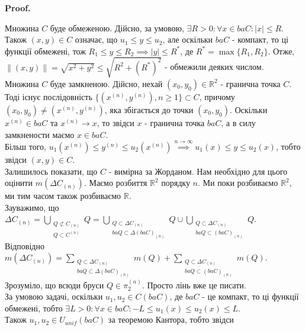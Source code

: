 \documentclass[a4paper, 10pt]{article}
\makeatletter
\def\qed{$\blacksquare$}
\theoremstyle{theoremdd}
\theoremstyle{theoremdd}
\theoremstyle{theoremdd}
\theoremstyle{theoremdd}
\theoremstyle{theoremdd}
\theoremstyle{theoremdd}
\theoremstyle{theoremdd}
\theoremstyle{theoremdd}
\renewenvironment{proof}[1][Proof.\\]{\par
\pushQED{\hfill \qed}%
\normalfont \topsep6\p@\@plus6\p@\relax
\trivlist
\item\relax
{\bfseries
#1\@addpunct{.}}\hspace\labelsep\ignorespaces
}{%
\popQED\endtrivlist\@endpefalse
}
\newcommand\Norm[1]{\left\lVert#1\right\rVert}
\makeatother
\begin{document}
\begin{proof}
Множина $C$ буде обмеженою. Дійсно, за умовою, $\exists R > 0: \forall x \in baC: |x| \leq R$. Також $(x,y) \in C$ означає, що $u_1 \leq y \leq u_2$, але оскільки $baC$ - компакт, то ці функції обмежені, тож $R_1 \leq y \leq R_2 \implies |y| \leq R^*$, де $R^* = \max\{R_1,R_2\}$. Отже,\\
$\Norm{(x,y)} = \sqrt{x^2+y^2} \leq \sqrt{R^2 + (R^*)^2}$ - обмежили деяких числом.
\bigskip \\
Множина $C$ буде замкненою. Дійсно, нехай $(x_0,y_0) \in \mathbb{R}^2$ - гранична точка $C$. Тоді існує послідовність $\{(x^{(n)},y^{(n)}), n \geq 1\} \subset C$, причому $(x_0,y_0) \neq (x^{(n)},y^{(n)})$, яка збігається до точки $(x_0,y_0)$. Оскільки $x^{(n)} \in baC$ та $x^{(n)} \to x$, то звідси $x$ - гранична точка $baC$, а в силу замкнености маємо $x \in baC$.\\
Більш того, $u_1(x^{(n)}) \leq y^{(n)} \leq u_2(x^{(n)}) \overset{n \to \infty}{\implies} u_1(x) \leq y \leq u_2(x)$, тобто звідси $(x,y) \in C$.
\bigskip \\
Залишилось показати, що $C$ - вимірна за Жорданом. Нам необхідно для цього оцінити $m(\Delta C_{(n)})$. Маємо розбиття $\mathbb{R}^2$ порядку $n$. Ми поки розбиваємо $\mathbb{R}^2$, ми тим часом також розбиваємо $\mathbb{R}$.\\
Зауважимо, що\\
$\Delta C_{(n)} = \displaystyle\bigcup_{\substack{Q \not\subset C_{(n)} \\ Q \subset C^{(n)}}} Q = \bigcup_{\substack{Q \subset \Delta C_{(n)} \\ baQ \subset \Delta (baC)_{(n)} }} Q \cup \bigcup_{\substack{Q \subset \Delta C_{(n)} \\ baQ \subset (baC)_{(n)} }} Q$.\\
Відповідно\\
$m(\Delta C_{(n)}) = \displaystyle\sum_{\substack{Q \subset \Delta C_{(n)} \\ baQ \subset \Delta (baC)_{(n)} }} m(Q) + \displaystyle\sum_{\substack{Q \subset \Delta C_{(n)} \\ baQ \subset (baC)_{(n)} }} m(Q)$.\\
Зрозуміло, що всюди бруси $Q \in \pi_2^{(n)}$. Просто лінь вже це писати.\\
За умовою задачі, оскільки $u_1,u_2 \in C(baC)$, де $baC$ - це компакт, то ці функції обмежені, тобто $\exists L > 0: \forall x \in baC: -L \leq u_1(x) \leq u_2(x) \leq L$.\\
Також $u_1,u_2 \in U_{unif}(baC)$ за теоремою Кантора, тобто звідси\\

\end{proof}
\end{document}
